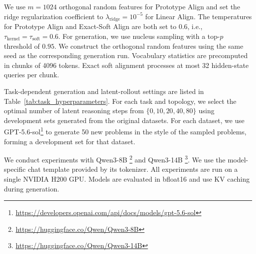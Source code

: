 \documentclass[11pt]{article}
\begin{document}
We use $m=1024$ orthogonal random features for Prototype Align and set the ridge regularization coefficient to $\lambda_{\mathrm{ridge}}=10^{-5}$ for Linear Align. The temperatures for Prototype Align and Exact-Soft Align are both set to $0.6$, i.e., $\tau_{\mathrm{kernel}}=\tau_{\mathrm{soft}}=0.6$. For generation, we use nucleus sampling with a top-$p$ threshold of $0.95$. 
We construct the orthogonal random features using the same seed as the corresponding generation run. Vocabulary statistics are precomputed in chunks of 4096 tokens. Exact soft alignment processes at most 32 hidden-state queries per chunk.

Task-dependent generation and latent-rollout settings are listed in Table~\ref{tab:task_hyperparameters}. 
For each task and topology, we select the optimal number of latent reasoning steps from $\{0, 10, 20, 40, 80\}$ using development sets generated from the original datasets.
For each dataset, we use GPT-5.6-sol\footnote{\url{https://developers.openai.com/api/docs/models/gpt-5.6-sol}} to generate 50 new problems in the style of the sampled problems, forming a development set for that dataset.

We conduct experiments with Qwen3-8B \footnote{\url{https://huggingface.co/Qwen/Qwen3-8B}} and Qwen3-14B \footnote{\url{https://huggingface.co/Qwen/Qwen3-14B}}\citep{qwen3}. We use the model-specific chat template provided by its tokenizer. All experiments are run on a single NVIDIA H200 GPU. Models are evaluated in bfloat16 and use KV caching during generation. 
\end{document}
